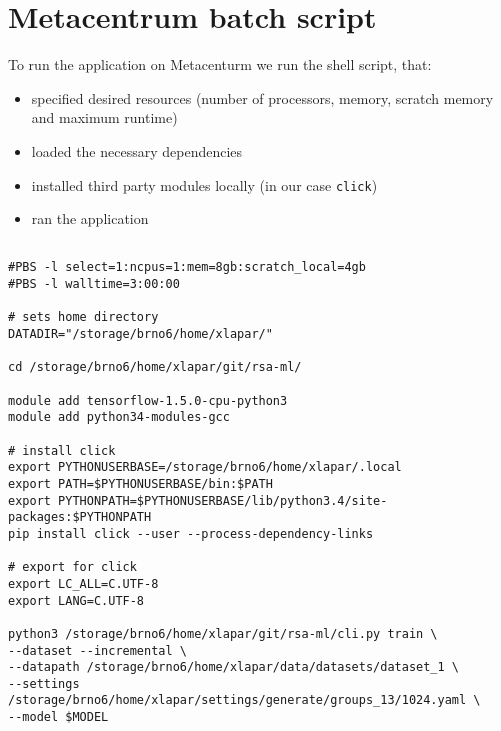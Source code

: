 \chapter{Metacentrum batch script}
\label{appendix-metacentrum}

To run the application on Metacenturm we run the shell script, that:

\begin{itemize}

\item specified desired resources (number of processors, memory, scratch memory and maximum runtime)

\item loaded the necessary dependencies

\item installed third party modules locally (in our case \texttt{click})

\item ran the application

\end{itemize}

\begin{verbatim}

#PBS -l select=1:ncpus=1:mem=8gb:scratch_local=4gb
#PBS -l walltime=3:00:00

# sets home directory
DATADIR="/storage/brno6/home/xlapar/"

cd /storage/brno6/home/xlapar/git/rsa-ml/

module add tensorflow-1.5.0-cpu-python3
module add python34-modules-gcc

# install click
export PYTHONUSERBASE=/storage/brno6/home/xlapar/.local
export PATH=$PYTHONUSERBASE/bin:$PATH
export PYTHONPATH=$PYTHONUSERBASE/lib/python3.4/site-packages:$PYTHONPATH
pip install click --user --process-dependency-links

# export for click
export LC_ALL=C.UTF-8
export LANG=C.UTF-8

python3 /storage/brno6/home/xlapar/git/rsa-ml/cli.py train \
--dataset --incremental \
--datapath /storage/brno6/home/xlapar/data/datasets/dataset_1 \
--settings /storage/brno6/home/xlapar/settings/generate/groups_13/1024.yaml \
--model $MODEL

\end{verbatim}

 